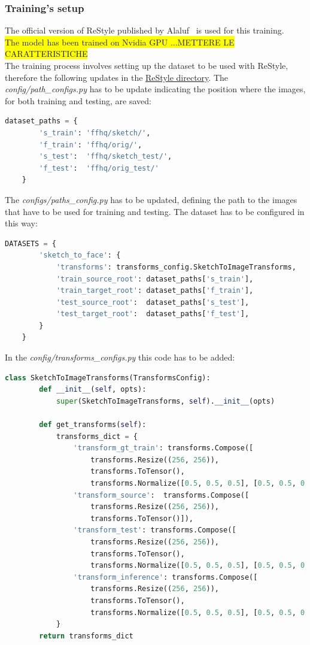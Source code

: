 \subsubsection{Training's setup}
The official version of ReStyle published by Alaluf~\cite{alaluf2021restyle} is used for this training. \\
\colorbox{yellow}{The model has been trained on Nvidia GPU ...METTERE LE CARATTERISTICHE}\\
The training process involves setting up the dataset to be used with ReStyle, therefore the following updates in the  \href{https://github.com/yuval-alaluf/restyle-encoder}{ReStyle directory}. The  \textit{config/path\_configs.py} has to be update indicating the position where the images, for both training and testing, are saved:
\begin{lstlisting}[language=Python, numbers=none]
    dataset_paths = {
        's_train': 'ffhq/sketch/',
        'f_train': 'ffhq/orig/',
        's_test':  'ffhq/sketch_test/',
        'f_test':  'ffhq/orig_test/'
    }
\end{lstlisting}
The \textit{configs/paths\_config.py} has to be updated, defining the path to the images that have to be used for training and testing. The dataset has to be configured in this way:
\begin{lstlisting}[language=Python, numbers=none]
    DATASETS = {
        'sketch_to_face': {
            'transforms': transforms_config.SketchToImageTransforms,
            'train_source_root': dataset_paths['s_train'],
            'train_target_root': dataset_paths['f_train'],
            'test_source_root':  dataset_paths['s_test'],
            'test_target_root':  dataset_paths['f_test'],
        }
    }
\end{lstlisting}
In the \textit{config/transforms\_configs.py} this code has to be added:
\begin{lstlisting}[language=Python, numbers=none]
    class SketchToImageTransforms(TransformsConfig):
        def __init__(self, opts):
            super(SketchToImageTransforms, self).__init__(opts)
    
        def get_transforms(self):
            transforms_dict = {
                'transform_gt_train': transforms.Compose([
                    transforms.Resize((256, 256)),
                    transforms.ToTensor(),
                    transforms.Normalize([0.5, 0.5, 0.5], [0.5, 0.5, 0.5])]),
                'transform_source':  transforms.Compose([
                    transforms.Resize((256, 256)),
                    transforms.ToTensor()]),
                'transform_test': transforms.Compose([
                    transforms.Resize((256, 256)),
                    transforms.ToTensor(),
                    transforms.Normalize([0.5, 0.5, 0.5], [0.5, 0.5, 0.5])]),
                'transform_inference': transforms.Compose([
                    transforms.Resize((256, 256)),
                    transforms.ToTensor(),
                    transforms.Normalize([0.5, 0.5, 0.5], [0.5, 0.5, 0.5])])
            }
        return transforms_dict
\end{lstlisting}
